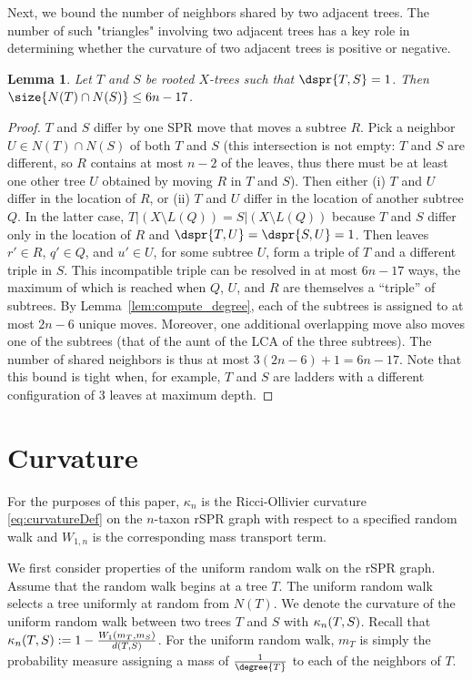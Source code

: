 \documentclass[11pt,onecolumn,conference]{IEEEtran}
\newtheorem{lemma}[theorem]{Lemma}
\newcommand{\curvature}[2][]{%
    \ifthenelse{\equal{#1}{}}%
		{\kappa_n(#2)}%
		{\kappa_n(#1;#2)}%
}
\begin{document}
Next, we bound the number of neighbors shared by two adjacent trees.
The number of such "triangles" involving two adjacent trees has a key role in determining whether the curvature of two adjacent trees is positive or negative.

\begin{lemma}
	\label{lem:shared_neighbors}
Let $T$ and $S$ be rooted $X$-trees such that $\dspr{T,S} = 1$.
Then $\size{N(T) \cap N(S)} \le 6n - 17$.
\end{lemma}

\begin{proof}
	$T$ and $S$ differ by one SPR move that moves a subtree $R$.
	Pick a neighbor $U \in N(T) \cap N(S)$ of both $T$ and $S$ (this intersection is not empty: $T$ and $S$ are different, so $R$ contains at most $n-2$ of the leaves, thus there must be at least one other tree $U$ obtained by moving $R$ in $T$ and $S$).
	Then either (i) $T$ and $U$ differ in the location of $R$, or (ii) $T$ and $U$ differ in the location of another subtree $Q$.
	In the latter case, $T|(X \setminus L(Q)) = S|(X \setminus L(Q))$ because $T$ and $S$ differ only in the location of $R$ and $\dspr{T,U} = \dspr{S,U} = 1$.
	Then leaves $r' \in R$, $q' \in Q$, and $u' \in U$, for some subtree $U$, form a triple of $T$ and a different triple in $S$.
	This incompatible triple can be resolved in at most $6n - 17$ ways, the maximum of which is reached when $Q$, $U$, and $R$ are themselves a ``triple'' of subtrees.
	By Lemma~\ref{lem:compute_degree}, each of the subtrees is assigned to at most $2n-6$ unique moves.
	Moreover, one additional overlapping move also moves one of the subtrees (that of the aunt of the LCA of the three subtrees).
	The number of shared neighbors is thus at most $3(2n-6) + 1 = 6n-17$.
	Note that this bound is tight when, for example, $T$ and $S$ are ladders with a different configuration of 3 leaves at maximum depth.
\end{proof}





\section{Curvature}
For the purposes of this paper, $\kappa_n$ is the Ricci-Ollivier curvature \eqref{eq:curvatureDef} on the $n$-taxon rSPR graph with respect to a specified random walk and $W_{1,n}$ is the corresponding mass transport term.

We first consider properties of the uniform random walk on the rSPR graph.
Assume that the random walk begins at a tree $T$.
The uniform random walk selects a tree uniformly at random from $N(T)$.
We denote the curvature of the uniform random walk between two trees $T$ and $S$ with $\curvature{T,S}$.
Recall that $\curvature{T, S} := 1 - \frac{W_1(m_T, m_S)}{d(T, S)}$.
For the uniform random walk, $m_T$ is simply the probability measure assigning a mass of $\frac{1}{\degree{T}}$ to each of the neighbors of $T$.
\end{document}
